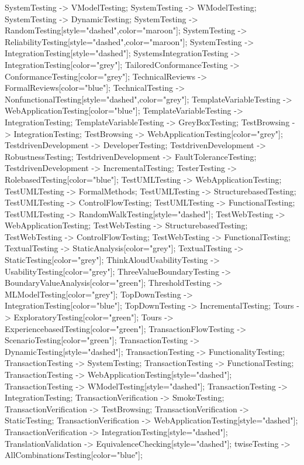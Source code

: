 \documentclass{article}
\begin{document}
{SystemTesting -> VModelTesting;
SystemTesting -> WModelTesting;
SystemTesting -> DynamicTesting;
SystemTesting -> RandomTesting[style="dashed",color="maroon"];
SystemTesting -> ReliabilityTesting[style="dashed",color="maroon"];
SystemTesting -> IntegrationTesting[style="dashed"];
SystemsIntegrationTesting -> IntegrationTesting[color="grey"];
TailoredConformanceTesting -> ConformanceTesting[color="grey"];
TechnicalReviews -> FormalReviews[color="blue"];
TechnicalTesting -> NonfunctionalTesting[style="dashed",color="grey"];
TemplateVariableTesting -> WebApplicationTesting[color="blue"];
TemplateVariableTesting -> IntegrationTesting;
TemplateVariableTesting -> GreyBoxTesting;
TestBrowsing -> IntegrationTesting;
TestBrowsing -> WebApplicationTesting[color="grey"];
TestdrivenDevelopment -> DeveloperTesting;
TestdrivenDevelopment -> RobustnessTesting;
TestdrivenDevelopment -> FaultToleranceTesting;
TestdrivenDevelopment -> IncrementalTesting;
TesterTesting -> RolebasedTesting[color="blue"];
TestUMLTesting -> WebApplicationTesting;
TestUMLTesting -> FormalMethods;
TestUMLTesting -> StructurebasedTesting;
TestUMLTesting -> ControlFlowTesting;
TestUMLTesting -> FunctionalTesting;
TestUMLTesting -> RandomWalkTesting[style="dashed"];
TestWebTesting -> WebApplicationTesting;
TestWebTesting -> StructurebasedTesting;
TestWebTesting -> ControlFlowTesting;
TestWebTesting -> FunctionalTesting;
TextualTesting -> StaticAnalysis[color="grey"];
TextualTesting -> StaticTesting[color="grey"];
ThinkAloudUsabilityTesting -> UsabilityTesting[color="grey"];
ThreeValueBoundaryTesting -> BoundaryValueAnalysis[color="green"];
ThresholdTesting -> MLModelTesting[color="grey"];
TopDownTesting -> IntegrationTesting[color="blue"];
TopDownTesting -> IncrementalTesting;
Tours -> ExploratoryTesting[color="green"];
Tours -> ExperiencebasedTesting[color="green"];
TransactionFlowTesting -> ScenarioTesting[color="green"];
TransactionTesting -> DynamicTesting[style="dashed"];
TransactionTesting -> FunctionalityTesting;
TransactionTesting -> SystemTesting;
TransactionTesting -> FunctionalTesting;
TransactionTesting -> WebApplicationTesting[style="dashed"];
TransactionTesting -> WModelTesting[style="dashed"];
TransactionTesting -> IntegrationTesting;
TransactionVerification -> SmokeTesting;
TransactionVerification -> TestBrowsing;
TransactionVerification -> StaticTesting;
TransactionVerification -> WebApplicationTesting[style="dashed"];
TransactionVerification -> IntegrationTesting[style="dashed"];
TranslationValidation -> EquivalenceChecking[style="dashed"];
twiseTesting -> AllCombinationsTesting[color="blue"];
}
\end{document}
